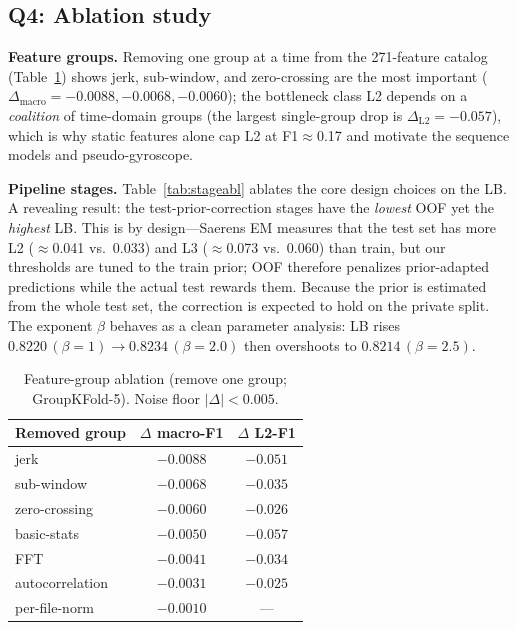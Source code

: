 \documentclass[conference]{IEEEtran}
\begin{document}
\subsection{Q4: Ablation study}
\label{sec:abl}
\textbf{Feature groups.} Removing one group at a time from the 271-feature catalog
(Table~\ref{tab:featabl}) shows jerk, sub-window, and zero-crossing are the most important
($\Delta_{\text{macro}}=-0.0088,-0.0068,-0.0060$); the bottleneck class L2 depends on a \emph{coalition} of
time-domain groups (the largest single-group drop is $\Delta_{\text{L2}}=-0.057$), which is why static
features alone cap L2 at F1$\approx$0.17 and motivate the sequence models and pseudo-gyroscope.

\textbf{Pipeline stages.} Table~\ref{tab:stageabl} ablates the core design choices on the LB. A revealing
result: the test-prior-correction stages have the \emph{lowest} OOF yet the \emph{highest} LB. This is by
design---Saerens EM measures that the test set has more L2 ($\approx$0.041 vs.\ 0.033) and L3
($\approx$0.073 vs.\ 0.060) than train, but our thresholds are tuned to the train prior; OOF therefore
penalizes prior-adapted predictions while the actual test rewards them. Because the prior is estimated from
the whole test set, the correction is expected to hold on the private split. The exponent $\beta$ behaves as
a clean parameter analysis: LB rises $0.8220\,(\beta{=}1)\!\rightarrow\!0.8234\,(\beta{=}2.0)$ then
overshoots to $0.8214\,(\beta{=}2.5)$.

\begin{table}[t]
\caption{Feature-group ablation (remove one group; GroupKFold-5). Noise floor $|\Delta|<0.005$.}
\label{tab:featabl}
\centering
\begin{tabular}{l c c}
\hline
\textbf{Removed group} & \textbf{$\Delta$ macro-F1} & \textbf{$\Delta$ L2-F1}\\
\hline
jerk & $-0.0088$ & $-0.051$ \\
sub-window & $-0.0068$ & $-0.035$ \\
zero-crossing & $-0.0060$ & $-0.026$ \\
basic-stats & $-0.0050$ & $-0.057$ \\
FFT & $-0.0041$ & $-0.034$ \\
autocorrelation & $-0.0031$ & $-0.025$ \\
per-file-norm & $-0.0010$ & --- \\
\hline
\end{tabular}
\end{table}
\end{document}
